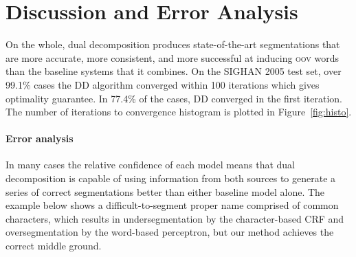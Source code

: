 \section{Discussion and Error Analysis}

On the whole, dual decomposition produces state-of-the-art segmentations that are more accurate, more consistent, and more successful at inducing \textsc{oov} words than the baseline systems that it combines.
On the SIGHAN 2005 test set, over 99.1\% cases the DD algorithm converged within 100 iterations which gives optimality guarantee. 
In 77.4\% of the cases, DD converged in the first iteration. The number of iterations to convergence histogram is plotted in Figure~\ref{fig:histo}.

\paragraph{Error analysis}


%
%
%
In many cases the relative confidence of each model means that dual decomposition is capable of using information from both sources to generate a series of correct segmentations better than either baseline model alone. The example below shows a difficult-to-segment proper name comprised of common characters, which results in undersegmentation by the character-based CRF and oversegmentation by the word-based perceptron, but our method achieves the correct middle ground.

